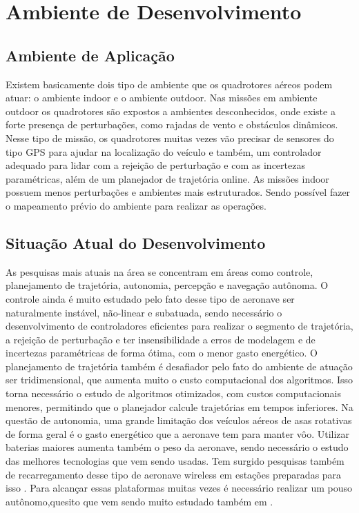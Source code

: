 \chapter{Ambiente de Desenvolvimento}
\label{chap:ambiente}

\section{Ambiente de Aplicação}

Existem basicamente dois tipo de ambiente que os quadrotores aéreos podem atuar: o ambiente indoor e o ambiente outdoor. Nas missões em ambiente outdoor os quadrotores são expostos a ambientes desconhecidos, onde existe a forte presença de perturbações, como rajadas de vento e obstáculos dinâmicos. Nesse tipo de missão, os quadrotores muitas vezes vão precisar de sensores do tipo GPS para ajudar na localização do veículo e também, um controlador adequado para lidar com a rejeição de perturbação e com as incertezas paramétricas, além de um planejador de trajetória online. As missões indoor possuem menos perturbações e ambientes mais estruturados. Sendo possível fazer o mapeamento prévio do ambiente para realizar as operações.

\section{Situação Atual do Desenvolvimento}

As pesquisas mais atuais na área se concentram em áreas como controle, planejamento de trajetória, autonomia, percepção e navegação autônoma. O controle ainda é muito estudado pelo fato desse tipo de aeronave ser naturalmente instável, não-linear e subatuada, sendo necessário o desenvolvimento de controladores eficientes para realizar o segmento de trajetória, a rejeição de perturbação e ter insensibilidade a erros de modelagem e de incertezas paramétricas de forma ótima, com o menor gasto energético. O planejamento de trajetória também é desafiador pelo fato do ambiente de atuação ser tridimensional, que aumenta muito o custo computacional dos algoritmos. Isso torna necessário o estudo de algoritmos otimizados, com custos computacionais menores, permitindo que o planejador calcule trajetórias em tempos inferiores. Na questão de autonomia, uma grande limitação dos veículos aéreos de asas rotativas de forma geral é o gasto energético que a aeronave tem para manter vôo. Utilizar baterias maiores aumenta também o peso da aeronave, sendo necessário o estudo das melhores tecnologias que vem sendo usadas. Tem surgido pesquisas também de recarregamento desse tipo de aeronave wireless em estações preparadas para isso \cite{Mulgaonkar2014,Sierra2019,Abdilla2015b}. Para alcançar essas plataformas muitas vezes é necessário realizar um pouso autônomo,quesito que vem sendo muito estudado também em \cite{Lim2021,Simon2018,Falanga2017a,Jin2016a,Serra2016a,Kim2016,Ling2014,Serra2014,Herisse2012}.

